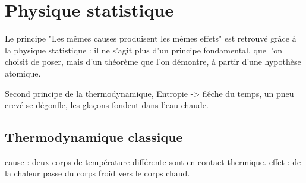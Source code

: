 
\section{Physique statistique}

Le principe "Les mêmes causes produisent les mêmes effets" est retrouvé grâce à la physique statistique : il ne s'agit plus d'un principe fondamental, que l'on choisit de poser, mais d'un théorème que l'on démontre, à partir d'une hypothèse atomique.

Second principe de la thermodynamique, Entropie -> flêche du temps, un pneu crevé se dégonfle, les glaçons fondent dans l'eau chaude.


\subsection{Thermodynamique classique}

cause : deux corps de température différente sont en contact thermique.
effet : de la chaleur passe du corps froid vers le corps chaud.


